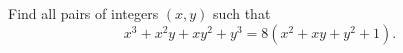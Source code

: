 Find all pairs of integers $(x, y)$ such that
\[
x^3 + x^2y + xy^2 + y^3 = 8(x^2 + xy + y^2 + 1).
\]
